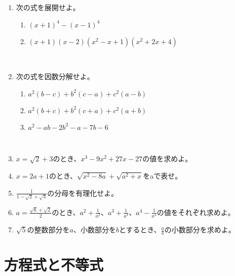 \documentclass[10pt,a4paper,fleqn]{jsarticle}
\begin{document}
\begin{enumerate}
\item 次の式を展開せよ。
\begin{enumerate}[(1)]
\item $(x+1)^4-(x-1)^4$
\item $(x+1)(x-2)(x^2-x+1)(x^2+2x+4)$
\end{enumerate}\

\item 次の式を因数分解せよ。
\begin{enumerate}[(1)]
\item $a^2(b-c)+b^2(c-a)+c^2(a-b)$
\item $a^2(b+c)+b^2(c+a)+c^2(a+b)$
\item $a^2-ab-2b^2-a-7b-6$
\end{enumerate}\

\item $x=\sqrt{2}+3$のとき、$x^3-9x^2+27x-27$の値を求めよ。\newline

\item $x=2a+1$のとき、$\sqrt{x^2-8a}+\sqrt{a^2+x}$をaで表せ。\newline

\item $\displaystyle\frac{1}{1-\sqrt{2}+\sqrt{3}}$の分母を有理化せよ。\newline

\item $a=\displaystyle\frac{\sqrt{6}+\sqrt{2}}{2}$のとき、$a^2+\displaystyle\frac{1}{a^2}$、$a^3+\displaystyle\frac{1}{a^3}$、$a^4-\displaystyle\frac{1}{a^4}$の値をそれぞれ求めよ。\newline

\item $\sqrt{5}$の整数部分を$a$、小数部分を$b$とするとき、$\displaystyle\frac{a}{b}$の小数部分を求めよ。\newline
\end{enumerate}

\section{方程式と不等式}
\end{document}
